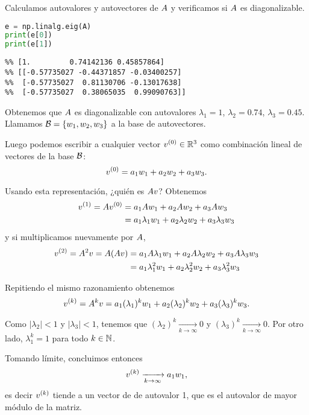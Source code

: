 Calculamos autovalores y autovectores de $\Ab$ y verificamos si $\Ab$ es diagonalizable.

\begin{Shaded}
\begin{lstlisting}[language=python]
e = np.linalg.eig(A)
print(e[0])
print(e[1])
\end{lstlisting}
\end{Shaded}

\begin{verbatim}
%% [1.         0.74142136 0.45857864]
%% [[-0.57735027 -0.44371857 -0.03400257]
%%  [-0.57735027  0.81130706 -0.13017638]
%%  [-0.57735027  0.38065035  0.99090763]]
\end{verbatim}

Obtenemos que $\Ab$ es diagonalizable con autovalores $\lambda_1 = 1$, $\lambda_2 = 0.74$, $\lambda_3 = 0.45$. Llamamos $\B = \{\wb_1, \wb_2, \wb_3\}$ a la base de autovectores.

Luego podemos escribir a cualquier vector  $\vb^{(0)} \in \R^3$ como combinación lineal de vectores de la base $\mathcal B$:
$$
\vb^{(0)} = a_1 \wb_1 + a_2 \wb_2 + a_3 \wb_3.
$$

Usando esta representación, ¿quién es $\Ab \vb$? Obtenemos
$$
\begin{aligned}
\vb^{(1)} = \Ab \vb^{(0)} &= a_1 \Ab \wb_1 + a_2 \Ab \wb_2 + a_3 \Ab \wb_3 \\
        &= a_1 \lambda_1 \wb_1 + a_2  \lambda_2  \wb_2 + a_3  \lambda_3 \wb_3
\end{aligned}
$$
y si multiplicamos nuevamente por $\Ab$,
$$
\begin{aligned}
\vb^{(2)} = \Ab^2 \vb = \Ab (\Ab \vb) &= a_1 \Ab \lambda_1 \wb_1 + a_2  \Ab \lambda_2  \wb_2 + a_3  \Ab \lambda_3 \wb_3\\
        &= a_1 \lambda_1^2 \wb_1 + a_2  \lambda_2^2  \wb_2 + a_3  \lambda_3^2 \wb_3
\end{aligned}
$$

Repitiendo el mismo razonamiento obtenemos
$$
\vb^{(k)} = \Ab^k \vb = a_1 (\lambda_1)^k \wb_1 + a_2 (\lambda_2)^k  \wb_2 + a_3 (\lambda_3)^k \wb_3.
$$

Como $|\lambda_2| < 1$ y $|\lambda_3|< 1$, tenemos que $(\lambda_2)^k \xrightarrow[k \rightarrow \infty]{} 0$ y $(\lambda_3)^k \xrightarrow[k \rightarrow \infty]{} 0$. Por otro lado, $\lambda_1^k = 1$ para todo $k \in \mathbb N$.

Tomando límite, concluimos entonces
$$
\vb^{(k)} \xrightarrow[k \rightarrow \infty]{} a_1 \wb_1,
$$
es decir $\vb^{(k)}$ tiende a un vector de de autovalor 1, que es el autovalor de mayor módulo de la matriz.

